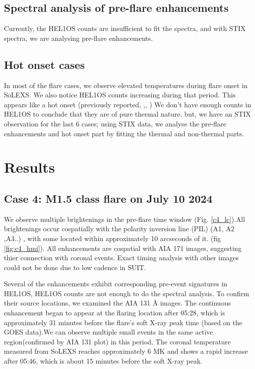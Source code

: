 \documentclass[fleqn,usenatbib]{mnras}
\begin{document}
\subsection{Spectral analysis of pre-flare enhancements}
Currently, the HEL1OS counts are insufficient to fit the spectra, and with STIX spectra, we are analysing pre-flare enhancements.

\subsection{Hot onset cases}
In most of the flare cases, we observe elevated temperatures during flare onset in SoLEXS.  We also notice HEL1OS counts increasing during that period. 
This appears like a hot onset (previously reported, \cite{hudson_hot_2021},\cite{hudson_anticipating_2025}, \cite{battaglia_existence_2023})
We don't have enough counts in HEL1OS to conclude that they are of pure thermal nature. 
but, we have an STIX observation for the last 6 cases; using STIX data, we analyse the pre-flare enhancements and hot onset part by fitting the thermal and non-thermal parts.

\section{Results}

\subsection{Case 4: M1.5 class flare on July 10 2024}
We observe multiple brightenings in the pre-flare time window (Fig. \ref{c4_lc}).All brightenings occur cospatially with the polarity inversion line (PIL) (A1, A2 ,A3..) , with some located within approximately 10 arcseconds of it. (fig \ref{fig:c4_hmi}). 
All enhancements are cospatial with AIA 171 images, suggesting thier connection with coronal events. Exact timing analysis with other images could not be done due to low cadence in SUIT.

Several of the enhancements exhibit corresponding pre-event signatures in HEL1OS, HEL1OS counts are not enough to do the spectral analysis. 
To confirm their source locations, we examined the AIA 131 Å images.
The continuous enhancement began to appear at the flaring location after 05:28, which is approximately 31 minutes before the flare's soft X-ray peak time (based on the GOES data).We can observe multiple small events in the same active region(confirmed by AIA 131 plot) in this period. 
The coronal temperature measured from SoLEXS reaches approximately 6 MK and shows a rapid increase after 05:46, which is about 15 minutes before the soft X-ray peak.
\end{document}
